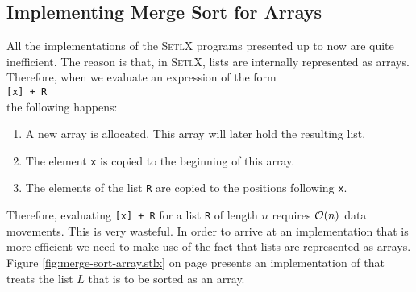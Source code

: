 \subsection{Implementing Merge Sort for Arrays}
All the implementations of the \textsc{SetlX} programs presented up to now are quite inefficient.  The
reason is that, in \textsc{SetlX}, lists are internally represented as arrays.  Therefore, when
we evaluate an expression of the form 
\\[0.2cm]
\hspace*{1.3cm}
\texttt{[x] + R}
\\[0.2cm]
the following happens:
\begin{enumerate}
\item A new array is allocated.  This array will later hold the resulting list.
\item The element \texttt{x} is copied to the beginning of this array.
\item The elements of the list \texttt{R} are copied to the positions following \texttt{x}.
\end{enumerate}
Therefore, evaluating \texttt{[x] + R} for a list \texttt{R} of length $n$ requires $\mathcal{O}(n)$ data
movements.  This is very wasteful.  In order to arrive at an
implementation that is more efficient we need to make use of the fact that lists are represented as arrays.
Figure \ref{fig:merge-sort-array.stlx} on page \pageref{fig:merge-sort-array.stlx} presents
an implementation of  that treats the list $L$ that is to be sorted as an array.


